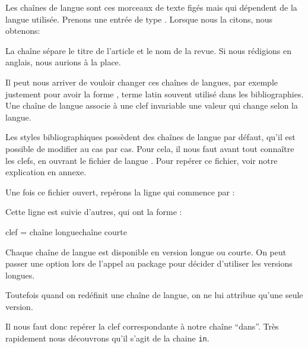     Les chaînes de langue sont ces morceaux de texte figés mais qui dépendent de la langue utilisée. Prenons une entrée de type . Lorsque nous la citons, nous obtenons:
    
     
     
    \begin{quotation}
        \cite{Junod1992}
    \end{quotation}
    
    La chaîne  sépare le titre de l'article et le nom de la revue. Si nous rédigions en anglais, nous aurions  à la place.  
    
    
    Il peut  nous arriver de vouloir changer ces chaînes de langues, par exemple justement pour avoir la forme , terme latin souvent utilisé dans les bibliographies.  Une chaîne de langue associe à une clef invariable une valeur qui change selon la langue.
    
    Les styles bibliographiques possèdent des chaînes de langue par défaut, qu'il est possible de modifier au cas par cas. Pour cela, il nous faut avant tout connaître les clefs, en ouvrant le fichier de langue . Pour repérer ce fichier, voir notre explication en annexe.
    
    Une fois ce fichier ouvert, repérons la ligne qui commence par :
    

    
    Cette ligne est suivie d'autres, qui ont la forme :
    
    \begin{latexcode}
clef    = {{chaîne longue}{chaîne courte}}
    \end{latexcode}

    
    \begin{plusloins}
    Chaque chaîne de langue est disponible en version longue ou courte. On peut passer une option lors de l'appel au package  pour décider d'utiliser les versions longues.
    
    \begin{latexcode}
\usepackage[abbreviate=false]{biblatex}
    \end{latexcode}

    
     Toutefois quand on redéfinit une chaîne de langue, on ne lui attribue qu'une seule version.
    
    \end{plusloins}
    
    Il nous faut donc repérer la clef correspondante à notre chaîne \enquote{dans}. Très rapidement nous découvrons qu'il s'agit de la chaine \verb|in|.
    
